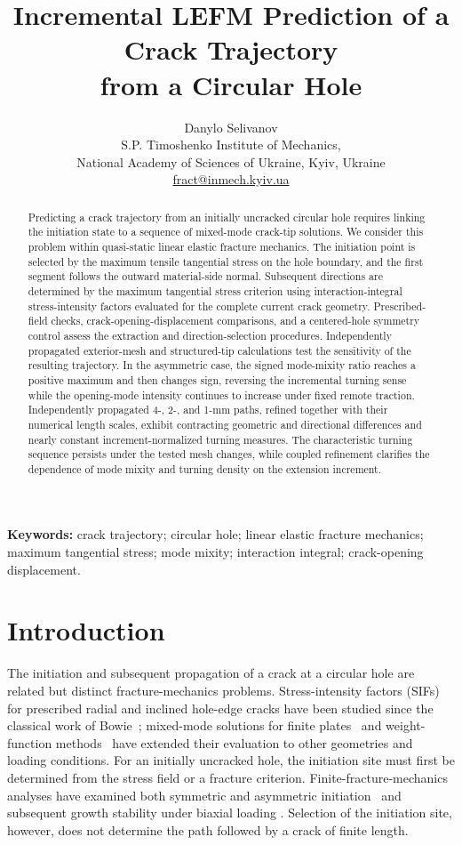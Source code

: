 \documentclass[11pt]{article}
\title{Incremental LEFM Prediction of a Crack Trajectory\\from a Circular Hole}
\author{Danylo Selivanov\\[0.3em]
\small S.P. Timoshenko Institute of Mechanics,\\
\small National Academy of Sciences of Ukraine, Kyiv, Ukraine\\[0.2em]
\small \href{mailto:fract@inmech.kyiv.ua}{fract@inmech.kyiv.ua}}
\date{}
\begin{document}
\maketitle
\begin{abstract}
Predicting a crack trajectory from an initially uncracked circular hole
requires linking the initiation state to a sequence of mixed-mode
crack-tip solutions. We consider this problem within quasi-static linear
elastic fracture mechanics. The initiation point is selected by the
maximum tensile tangential stress on the hole boundary, and the
first segment follows the outward material-side normal. Subsequent
directions are determined by the maximum tangential stress criterion
using interaction-integral stress-intensity factors evaluated for the
complete current crack geometry. Prescribed-field checks,
crack-opening-displacement comparisons, and a centered-hole
symmetry control assess the extraction and direction-selection
procedures. Independently propagated exterior-mesh and
structured-tip calculations test the sensitivity of the resulting
trajectory. In the asymmetric case, the signed mode-mixity ratio
reaches a positive maximum and then changes sign, reversing the
incremental turning sense while the opening-mode intensity
continues to increase under fixed remote traction. Independently
propagated 4-, 2-, and 1-mm paths, refined together with their
numerical length scales, exhibit contracting geometric and
directional differences and nearly constant increment-normalized
turning measures. The characteristic turning sequence persists under the tested mesh
changes, while coupled refinement clarifies the dependence of
mode mixity and turning density on the extension increment.
\end{abstract}
\noindent\textbf{Keywords:} crack trajectory; circular hole; linear elastic
fracture mechanics; maximum tangential stress; mode mixity; interaction
integral; crack-opening displacement.

\section{Introduction}
The initiation and subsequent propagation of a crack at a circular hole
are related but distinct fracture-mechanics problems. Stress-intensity
factors (SIFs) for prescribed radial and inclined hole-edge cracks have been
studied since the classical work of Bowie~\cite{Bowie1956}; mixed-mode
solutions for finite plates~\cite{WooWangCheung1989} and weight-function
methods~\cite{XuEtAl2018} have extended their evaluation to other
geometries and loading conditions. For an initially uncracked hole,
the initiation site must first be determined from the stress field or a
fracture criterion. Finite-fracture-mechanics analyses have examined
both symmetric and asymmetric initiation~\cite{SaporaEtAl2018} and
subsequent growth stability under biaxial loading
\cite{SaporaCornetti2018}. Selection of the initiation site, however,
does not determine the path followed by a crack of finite length.
\end{document}
